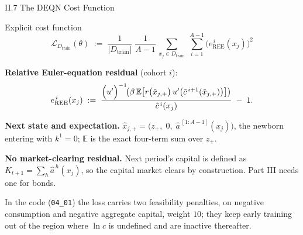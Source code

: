 \documentclass[aspectratio=169,11pt]{beamer}
\newcommand{\emphc}[1]{\textcolor{harvardcrimson}{#1}}
\newcommand{\E}[1]{\mathbb{E}\!\left[#1\right]}
\newcommand{\Loss}{\mathcal{L}}
\begin{document}
\begin{frame}{II.7 The DEQN Cost Function}
\footnotesize
\begin{block}{Explicit cost function}
\[
\boxed{\;\Loss_{D_{\text{train}}}(\theta) \;:=\; \frac{1}{|D_{\text{train}}|}\;\frac{1}{A-1}\,
\sum_{x_j \in D_{\text{train}}}\;\sum_{i=1}^{A-1} \bigl(e_{\text{REE}}^{\,i}(x_j)\bigr)^2\;}
\]
\end{block}

\vspace{0.3em}
\textbf{Relative Euler-equation residual} (cohort $i$):
\[
e_{\text{REE}}^{\,i}(x_j) \;:=\;
\frac{\Bigl(u'\Bigr)^{-1}\!\!\left(\beta\,\E{r\bigl(\hat x_{j,+}\bigr)\,u'\bigl(\hat c^{\,i+1}(\hat x_{j,+})\bigr)}\right)}{\hat c^{\,i}(x_j)} \;-\; 1.
\]

\textbf{Next state and expectation.}  $\hat x_{j,+} = \bigl(z_+,\; 0,\; \hat a^{\,[1:A-1]}(x_j)\bigr)$, the newborn entering with $k^1 = 0$; $\mathbb{E}$ is the exact four-term sum over $z_+$.

\textbf{No market-clearing residual.}  Next period's capital is defined as $K_{t+1}=\sum_h \hat a^{\,h}(x_j)$, so the capital market clears by construction. Part III needs one for bonds.

\vspace{0.2em}
{\scriptsize \emphc{In the code} (\texttt{04\_01}) the loss carries two feasibility penalties, on negative consumption and negative aggregate capital, weight $10$; they keep early training out of the region where $\ln c$ is undefined and are inactive thereafter.}

\end{frame}
\end{document}
